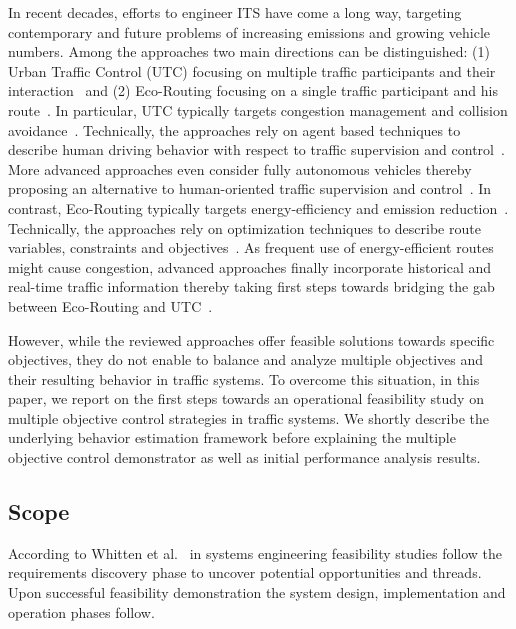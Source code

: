 \documentclass[conference]{../cls/IEEEtran}
\begin{document}
In recent decades, efforts to engineer ITS have come a long way, targeting contemporary and future problems of increasing emissions and growing vehicle numbers. Among the approaches two main directions can be distinguished: (1) Urban Traffic Control (UTC) focusing on multiple traffic participants and their interaction~\cite{Chen2010,Dresner2008} and (2) Eco-Routing focusing on a single traffic participant and his route~\cite{Ericsson2006, Barth2007,Boriboonsomsin2012}. In particular, UTC typically targets congestion management and collision avoidance~\cite{Chen2010}. Technically, the approaches rely on agent based techniques to describe human driving behavior with respect to traffic supervision and control~\cite{Chen2010}. More advanced approaches even consider fully autonomous vehicles thereby proposing an alternative to human-oriented traffic supervision and control~\cite{Dresner2008}. In contrast, Eco-Routing typically targets energy-efficiency and emission reduction~\cite{Ericsson2006,Barth2007}. Technically, the approaches rely on optimization techniques to describe route variables, constraints and objectives~\cite{Ericsson2006,Barth2007}. As frequent use of energy-efficient routes might cause congestion, advanced approaches finally incorporate historical and real-time traffic information thereby taking first steps towards bridging the gab between Eco-Routing and UTC~\cite{Boriboonsomsin2012}.

However, while the reviewed approaches offer feasible solutions towards specific objectives, they do not enable to balance and analyze multiple objectives and their resulting behavior in traffic systems. To overcome this situation, in this paper, we report on the first steps towards an operational feasibility study on multiple objective control strategies in traffic systems. We shortly describe the underlying behavior estimation framework before explaining the multiple objective control demonstrator as well as initial performance analysis results.

\subsection{Scope}

According to Whitten et al.~\cite{Whitten2005} in systems engineering feasibility studies follow the requirements discovery phase to uncover potential opportunities and threads. Upon successful feasibility demonstration the system design, implementation and operation phases follow.
\end{document}
